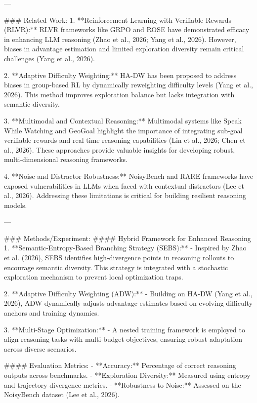 ---

### Related Work:
1. **Reinforcement Learning with Verifiable Rewards (RLVR):** RLVR frameworks like GRPO and ROSE have demonstrated efficacy in enhancing LLM reasoning (Zhao et al., 2026; Yang et al., 2026). However, biases in advantage estimation and limited exploration diversity remain critical challenges (Yang et al., 2026).
   
2. **Adaptive Difficulty Weighting:** HA-DW has been proposed to address biases in group-based RL by dynamically reweighting difficulty levels (Yang et al., 2026). This method improves exploration balance but lacks integration with semantic diversity.

3. **Multimodal and Contextual Reasoning:** Multimodal systems like Speak While Watching and GeoGoal highlight the importance of integrating sub-goal verifiable rewards and real-time reasoning capabilities (Lin et al., 2026; Chen et al., 2026). These approaches provide valuable insights for developing robust, multi-dimensional reasoning frameworks.

4. **Noise and Distractor Robustness:** NoisyBench and RARE frameworks have exposed vulnerabilities in LLMs when faced with contextual distractors (Lee et al., 2026). Addressing these limitations is critical for building resilient reasoning models.

---

### Methods/Experiment:
#### Hybrid Framework for Enhanced Reasoning
1. **Semantic-Entropy-Based Branching Strategy (SEBS):**
   - Inspired by Zhao et al. (2026), SEBS identifies high-divergence points in reasoning rollouts to encourage semantic diversity. This strategy is integrated with a stochastic exploration mechanism to prevent local optimization traps.

2. **Adaptive Difficulty Weighting (ADW):**
   - Building on HA-DW (Yang et al., 2026), ADW dynamically adjusts advantage estimates based on evolving difficulty anchors and training dynamics.

3. **Multi-Stage Optimization:**
   - A nested training framework is employed to align reasoning tasks with multi-budget objectives, ensuring robust adaptation across diverse scenarios.

#### Evaluation Metrics:
- **Accuracy:** Percentage of correct reasoning outputs across benchmarks.
- **Exploration Diversity:** Measured using entropy and trajectory divergence metrics.
- **Robustness to Noise:** Assessed on the NoisyBench dataset (Lee et al., 2026).

